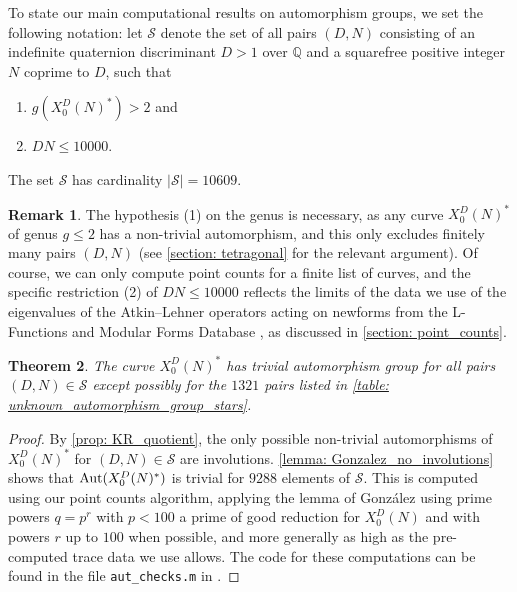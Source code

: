 \documentclass[11pt,reqno]{amsart}
\newcommand{\Q}{\mathbb{Q}}
\newcommand{\Aut}{{\rm Aut}}
\newtheorem{theorem}{Theorem}[section]
\theoremstyle{definition}
\newtheorem{remark}[theorem]{Remark}
\begin{document}
To state our main computational results on automorphism groups, we set the following notation: let $\mathcal{S}$ denote the set of all pairs $(D,N)$ consisting of an indefinite quaternion discriminant $D>1$ over $\Q$ and a squarefree positive integer $N$ coprime to $D$, such that 
\begin{enumerate}
    \item $g(X_0^D(N)^*) > 2$ and
    \item $DN \leq 10000$. 
\end{enumerate}
The set $\mathcal{S}$ has cardinality $|\mathcal{S}| = 10609$. 

\begin{remark}
The hypothesis (1) on the genus is necessary, as any curve $X_0^D(N)^*$ of genus $g \leq 2$ has a non-trivial automorphism, and this only excludes finitely many pairs $(D,N)$ (see \cref{section: tetragonal} for the relevant argument). Of course, we can only compute point counts for a finite list of curves, and the specific restriction (2) of $DN \leq 10000$ reflects the limits of the data we use of the eigenvalues of the Atkin--Lehner operators acting on newforms from the L-Functions and Modular Forms Database \cite{LMFDB}, as discussed in \cref{section: point_counts}.
\end{remark}

\begin{theorem}\label{theorem: star_auts}
The curve $X_0^D(N)^*$ has trivial automorphism group for all pairs $(D,N) \in \mathcal{S}$ except possibly for the $1321$ pairs listed in \cref{table: unknown_automorphism_group_stars}. 
\end{theorem}
\begin{proof}
By \cref{prop: KR_quotient}, the only possible non-trivial automorphisms of $X_0^D(N)^*$ for $(D,N) \in \mathcal{S}$ are involutions. \cref{lemma: Gonzalez_no_involutions} shows that $\Aut(X_0^D(N)^*)$ is trivial for $9288$ elements of $\mathcal{S}$. This is computed using our point counts algorithm, applying the lemma of Gonz\'{a}lez using prime powers $q = p^r$ with $p<100$ a prime of good reduction for $X_0^D(N)$ and with powers $r$ up to $100$ when possible, and more generally as high as the pre-computed trace data we use allows. The code for these computations can be found in the file \texttt{aut{\_}checks.m} in \cite{MPSSRep}.
\end{proof}
\end{document}
